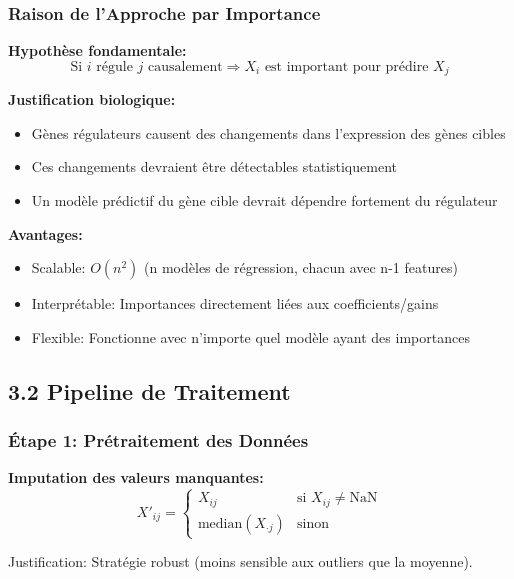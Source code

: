 \documentclass[12pt,a4paper,french]{article}
\begin{document}
\subsubsection{Raison de l'Approche par Importance}

\textbf{Hypothèse fondamentale:}
\begin{equation}
\text{Si } i \text{ régule } j \text{ causalement} \Rightarrow X_i \text{ est important pour prédire } X_j
\end{equation}

\textbf{Justification biologique:}
\begin{itemize}
    \item Gènes régulateurs causent des changements dans l'expression des gènes cibles
    \item Ces changements devraient être détectables statistiquement
    \item Un modèle prédictif du gène cible devrait dépendre fortement du régulateur
\end{itemize}

\textbf{Avantages:}
\begin{itemize}
    \item Scalable: $O(n^2)$ (n modèles de régression, chacun avec n-1 features)
    \item Interprétable: Importances directement liées aux coefficients/gains
    \item Flexible: Fonctionne avec n'importe quel modèle ayant des importances
\end{itemize}

\subsection{3.2 Pipeline de Traitement}

\subsubsection{Étape 1: Prétraitement des Données}

\textbf{Imputation des valeurs manquantes:}
\begin{equation}
X'_{ij} = \begin{cases}
X_{ij} & \text{si } X_{ij} \neq \text{NaN} \\
\text{median}(X_{\cdot j}) & \text{sinon}
\end{cases}
\end{equation}

Justification: Stratégie robust (moins sensible aux outliers que la moyenne).
\end{document}
